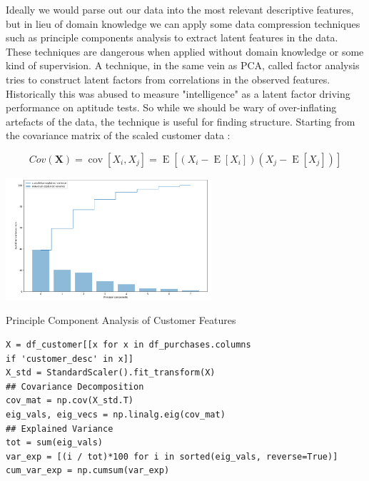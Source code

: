 \documentclass{tufte-handout}
\begin{document}
\noindent Ideally we would parse out our data into the most relevant descriptive features, but in lieu of domain knowledge we can apply some data compression techniques such as principle components analysis to extract latent features in the data. These techniques are dangerous when applied without domain knowledge or some kind of supervision. A technique, in the same vein as PCA, called factor analysis tries to construct latent factors from correlations in the observed features. Historically this was abused to measure "intelligence" as a latent factor driving performance on aptitude tests. So while we should be wary of over-inflating artefacts of the data, the technique is useful for finding structure. Starting from the covariance matrix of the scaled customer data :

$$ Cov(\mathbf{X}) = \operatorname{cov}[X_i, X_j] = \operatorname{E}[(X_i - \operatorname{E}[X_i])(X_j - \operatorname{E}[X_j])]
$$

\begin{marginfigure}
\includegraphics[width=3in, height=5.in]{Plots/pca_explained_variance.png}
\caption{Principle Component Analysis of Customer Features}
\end{marginfigure}

\begin{verbatim}
X = df_customer[[x for x in df_purchases.columns 
if 'customer_desc' in x]]
X_std = StandardScaler().fit_transform(X)
## Covariance Decomposition
cov_mat = np.cov(X_std.T)
eig_vals, eig_vecs = np.linalg.eig(cov_mat)
## Explained Variance
tot = sum(eig_vals)
var_exp = [(i / tot)*100 for i in sorted(eig_vals, reverse=True)]
cum_var_exp = np.cumsum(var_exp)
\end{verbatim}
\end{document}
